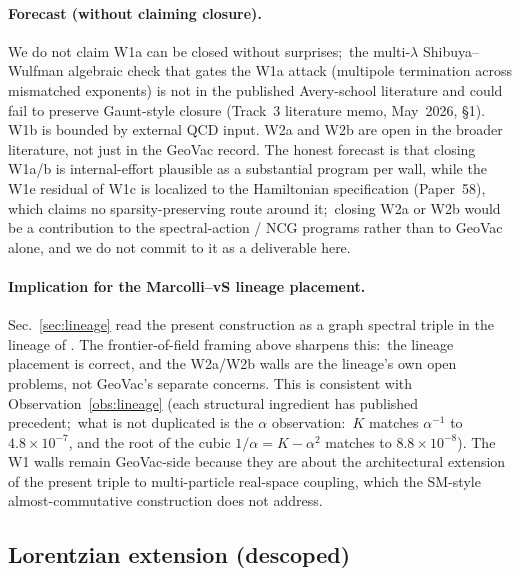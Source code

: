 \documentclass[11pt]{article}
\begin{document}
\paragraph{Forecast (without claiming closure).}

We do not claim W1a can be closed without surprises;\ the
multi-$\lambda$ Shibuya--Wulfman algebraic check that gates the W1a
attack (multipole termination across mismatched exponents)
is not in the published Avery-school literature and could fail to
preserve Gaunt-style closure (Track~3 literature memo, May~2026,
\S 1).  W1b is bounded by external QCD input.  W2a and W2b are open
in the broader literature, not just in the GeoVac record.  The honest
forecast is that closing W1a/b is internal-effort plausible as a
substantial program per wall, while the W1e residual of W1c is
localized to the Hamiltonian specification (Paper~58), which claims no
sparsity-preserving route around it;\ closing W2a or W2b would be a
contribution to the spectral-action / NCG programs rather than to
GeoVac alone, and we do not commit to it as a deliverable here.

\paragraph{Implication for the Marcolli--vS lineage placement.}

Sec.~\ref{sec:lineage} read the present construction as a graph
spectral triple in the lineage of \cite{marcolli_vs2014, perez_sanchez2024,
perez_sanchez2025}.  The frontier-of-field framing above sharpens this:\
the lineage placement is correct, and the W2a/W2b walls are the lineage's
own open problems, not GeoVac's separate concerns.  This is consistent
with Observation~\ref{obs:lineage} (each structural ingredient has
published precedent;\ what is not duplicated is the $\alpha$
observation:\ $K$ matches $\alpha^{-1}$ to $4.8 \times 10^{-7}$, and the
root of the cubic $1/\alpha = K - \alpha^2$ matches to $8.8 \times 10^{-8}$).  The W1 walls remain GeoVac-side
because they are about the architectural extension of the present
triple to multi-particle real-space coupling, which the SM-style almost-commutative
construction does not address.

\subsection{Lorentzian extension (descoped)}
\label{sec:lorentzian_audit_paper32}
\end{document}

